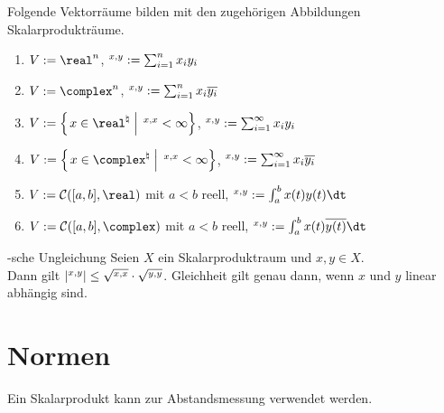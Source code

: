 \begin{Bsp}
    Folgende Vektorräume bilden mit den zugehörigen Abbildungen Skalarprodukträume.
    \begin{enumerate}[label=\emph{(\alph*)}]
        \item
        $V := \real^n$, $\sp{x, y} := \sum_{i=1}^n x_i y_i$

        \item
        $V := \complex^n$, $\sp{x, y} := \sum_{i=1}^n x_i \overline{y_i}$

        \item
        $V := \left\{\left.x \in \real^\natural \;\right|\; \sp{x, x} < \infty\right\}$,
        $\sp{x, y} := \sum_{i=1}^\infty x_i y_i$

        \item
        $V := \left\{\left.x \in \complex^\natural \;\right|\; \sp{x, x} < \infty\right\}$,
        $\sp{x, y} := \sum_{i=1}^\infty x_i \overline{y_i}$

        \item
        $V := \C([a,b], \real)$ mit $a < b$ reell, $\sp{x, y} := \int_a^b x(t)y(t)\dt$

        \item
        $V := \C([a,b], \complex)$ mit $a < b$ reell, $\sp{x, y} := \int_a^b x(t)\kk{y(t)}\dt$
    \end{enumerate}
\end{Bsp}

\begin{Satz}{-sche Ungleichung}
    Seien $X$ ein Skalarproduktraum und $x, y \in X$.\\
    Dann gilt $|\sp{x, y}| \le \sqrt{\sp{x, x}} \cdot \sqrt{\sp{y, y}}$.
    Gleichheit gilt genau dann, wenn $x$ und $y$ linear abhängig sind.
\end{Satz}

\section{%
    Normen%
}

\begin{Bem}
    Ein Skalarprodukt kann zur Abstandsmessung verwendet werden.
\end{Bem}

